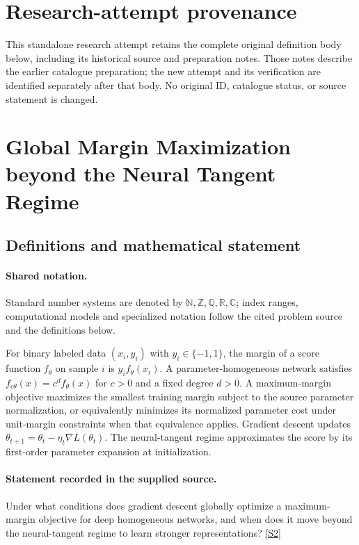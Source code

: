 \documentclass[11pt]{article}
\begin{document}
\section*{Research-attempt provenance}
This standalone research attempt retains the complete original definition body below,
including its historical source and preparation notes. Those notes describe the
earlier catalogue preparation; the new attempt and its verification are identified
separately after that body. No original ID, catalogue status, or source statement is changed.

\section{Global Margin Maximization beyond the Neural Tangent Regime}\label{statement}

\subsection{Definitions and mathematical statement}

\paragraph{Shared notation.}Standard number systems are denoted by $\mathbb N,\mathbb Z,\mathbb Q,\mathbb R,\mathbb C$; index ranges, computational models and specialized notation follow the cited problem source and the definitions below.


For binary labeled data $(x_i,y_i)$ with $y_i\in\{-1,1\}$, the margin of a score function $f_\theta$ on sample $i$ is $y_i f_\theta(x_i)$. A parameter-homogeneous network satisfies $f_{c\theta}(x)=c^d f_\theta(x)$ for $c>0$ and a fixed degree $d>0$. A maximum-margin objective maximizes the smallest training margin subject to the source parameter normalization, or equivalently minimizes its normalized parameter cost under unit-margin constraints when that equivalence applies. Gradient descent updates $\theta_{t+1}=\theta_t-\eta_t\nabla L(\theta_t)$. The neural-tangent regime approximates the score by its first-order parameter expansion at initialization.
\paragraph{Statement recorded in the supplied source.}
Under what conditions does gradient descent globally optimize a maximum-margin objective for deep homogeneous networks, and when does it move beyond the neural-tangent regime to learn stronger representations? \href{https://doi.org/10.4171/owr/2022/46}{[S2]}
\end{document}
